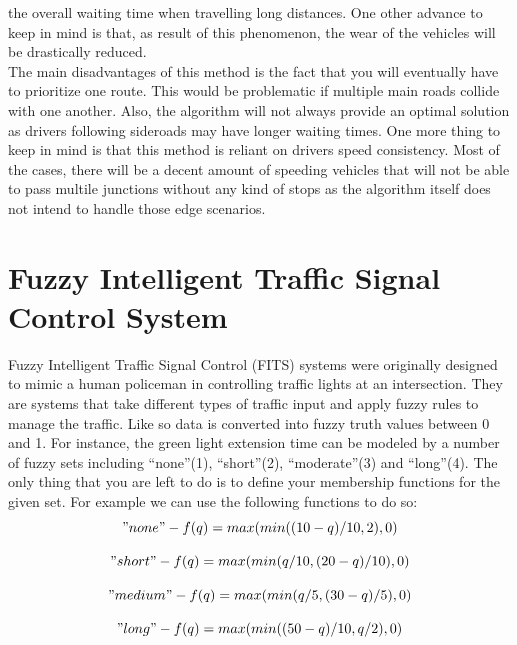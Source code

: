 \documentclass[17pt]{report}
\begin{document}
the overall waiting time when travelling long distances. One other advance to keep in
mind is that, as result of this phenomenon, the wear of the vehicles will be
drastically reduced.\\
\indent \indent
The main disadvantages of this method is the fact that you will eventually have to
prioritize one route. This would be problematic if multiple main roads collide with
one another. Also, the algorithm will not always provide an optimal solution as
drivers following sideroads may have longer waiting times. One more thing to keep in mind
is that this method is reliant on drivers speed consistency. Most of the cases, there 
will be a decent amount of speeding vehicles that will not be able to pass multile
junctions without any kind of stops as the algorithm itself does not intend to handle those 
edge scenarios.

\section{Fuzzy Intelligent Traffic Signal Control System}
\indent \indent
Fuzzy Intelligent Traffic Signal Control (FITS) \cite{Teo2010} \cite{Jin2017}
systems were originally designed to mimic a human policeman in controlling
traffic lights at an intersection. They are systems that take
different types of traffic input and apply fuzzy rules to 
manage the traffic. Like so data is converted into fuzzy truth
values between 0 and 1. For instance, the green light extension
time can be modeled by a number of fuzzy sets including “none”(1),
“short”(2), “moderate”(3) and “long”(4). The only thing that you are left to do is
to define your membership functions for the given set. For example we can
use the following functions to do so:\\

\begin{equation}
    "none" - f(q) = max(min((10 - q) / 10, 2), 0)
\end{equation}

\begin{equation}
    "short" - f(q) = max(min(q / 10, (20 - q) / 10), 0)
\end{equation}

\begin{equation}
    "medium" - f(q) = max(min(q / 5, (30 - q) / 5), 0)
\end{equation}

\begin{equation}
    "long" - f(q) = max(min((50 - q) / 10, q / 2), 0)
\end{equation}
\end{document}

